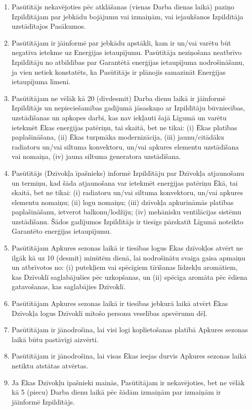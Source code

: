 \begin{multicols}{2}
\begin{enumerate}
	\item Pasūtītājs nekavējoties pēc atklāšanas (vienas Darba dienas laikā) paziņo Izpildītājam par jebkādu bojājumu vai izmaiņām, vai iejaukšanos Izpildītāja uzstādītajos Pasākumos.
	\item Pasūtītājam ir jāinformē par jebkādu apstākli, kam ir un/vai varētu būt negatīva ietekme uz Enerģijas ietaupījumu. Pasūtītāja neziņošana neatbrīvo Izpildītāju no atbildības par Garantētā enerģijas ietaupījuma nodrošināšanu, ja vien netiek konstatēts, ka Pasūtītājs ir plānojis samazināt Enerģijas ietaupījuma līmeni.
	\item Pasūtītājam ne vēlāk kā 20 (divdesmit) Darba dienu laikā ir jāinformē Izpildītājs un nepieciešamības gadījumā jāsaskaņo ar Izpildītāju būvniecības, uzstādīšanas un apkopes darbi, kas nav iekļauti šajā Līgumā un varētu ietekmēt Ēkas enerģijas patēriņu, tai skaitā, bet ne tikai: (i) Ēkas platības paplašināšana, (ii) Ēkas turpmāka modernizācija, (iii) jaunu/citādāku radiatoru un/vai siltuma konvektoru, un/vai apkures elementu uzstādīšana vai nomaiņa, (iv) jauna siltuma ģeneratora uzstādīšana.
	\item Pasūtītājs (Dzīvokļa īpašnieks) informē Izpildītāju par Dzīvokļa atjaunošanu un termiņu, kad šāda atjaunošana var ietekmēt enerģijas patēriņu Ēkā, tai skaitā, bet ne tikai: (i) radiatoru un/vai siltuma konvektoru, un/vai apkures elementu nomaiņu; (ii) logu nomaiņu; (iii) dzīvokļa apkurināmās platības paplašināšanu, ietverot balkonu/lodžiju; (iv) mehānisku ventilācijas sistēmu uzstādīšanu. Šādos gadījumos Izpildītājs ir tiesīgs pārskatīt Līgumā noteikto Garantēto enerģijas ietaupījumu.
	\item Pasūtītājam Apkures sezonas laikā ir tiesības logus Ēkas dzīvokļos atvērt ne ilgāk kā uz 10 (desmit) minūtēm dienā, lai nodrošinātu svaiga gaisa apmaiņu un atbrīvotos no: (i) putekļiem vai spēcīgiem tīrīšanas līdzekļu aromātiem, kas Dzīvoklī saglabājušies pēc uzkopšanas, un (ii) spēcīga aromāta pēc ēdiena gatavošanas, kas saglabājies Dzīvoklī.
	\item Pasūtītājam Apkures sezonas laikā ir tiesības jebkurā laikā atvērt Ēkas Dzīvokļa logus Dzīvoklī mītošo personu veselības apsvērumu dēļ.
	\item Pasūtītājam ir jānodrošina, lai visi logi koplietošanas platībā Apkures sezonas laikā būtu pastāvīgi aizvērti.
	\item Pasūtītājam ir jānodrošina, lai visas Ēkas ieejas durvis Apkures sezonas laikā netiktu atstātas atvērtas.
	\item Ja Ēkas Dzīvokļu īpašnieki mainās, Pasūtītājam ir nekavējoties, bet ne vēlāk kā 5 (piecu) Darba dienu laikā pēc šādām izmaiņām par izmaiņām ir jāinformē Izpildītājs.

\end{enumerate}
\end{multicols}
